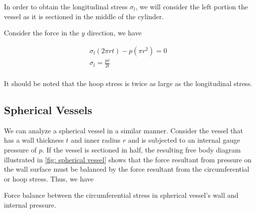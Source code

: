 \documentclass[
fontsize=10pt,
a4paper,
twosides=false,
open=any,
svgnames,
]{kaobook} %
\begin{document}
In order to obtain the longitudinal stress $\sigma_l$, we will consider the left portion the vessel as it is sectioned in the middle of the cylinder.

Consider the force in the $y$ direction, we have

\begin{equation}
  \begin{gathered}
    {\sigma _l}(2\pi rt) - p(\pi {r^2}) = 0 \\ 
    {\sigma _l} = \frac{pr}{2t} \\ 
  \end{gathered}
\end{equation}

It should be noted that the hoop stress is twice as large as the longitudinal stress.

\subsection{Spherical Vessels}

We can analyze a spherical vessel in a similar manner. Consider the vessel that has a wall thickness $t$ and inner radius $r$ and is subjected to an internal gauge pressure of $p$. If the vessel is sectioned in half, the resulting free body diagram illustrated in \cref{fig: spherical vessel} shows that the force resultant from pressure on the wall surface must be balanced by the force resultant from the circumferential or hoop stress. Thus, we have

\begin{marginfigure}
  \centering
  \caption{Force balance between the circumferential stress in spherical vessel's wall and internal pressure.}
  \label{fig: spherical vessel}
\end{marginfigure}
\end{document}
